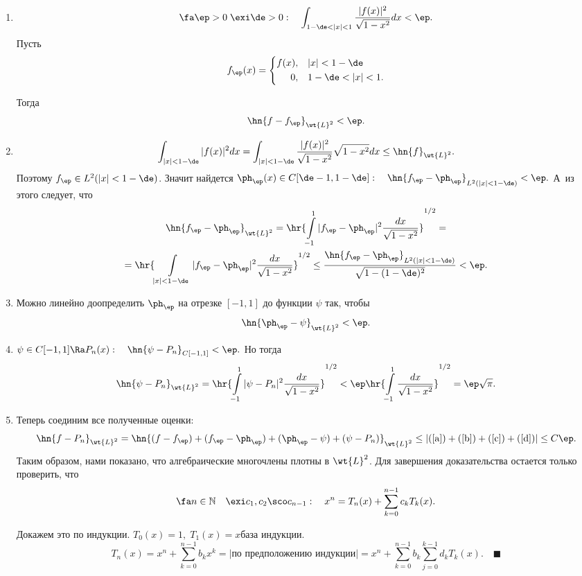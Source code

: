 \documentclass[a4paper]{article}
\begin{document}
\begin{enumerate}
\item
$$\fa\ep>0\;\exi\de>0:\quad\int_{1-\de<|x|<1}\frac{|f(x)|^2}{\sqrt{1-x^2}}dx<\ep.$$
Пусть
$$f_{\ep}(x)=\left\{\begin{aligned}f(x),&\quad|x|<1-\de\\
0,&\quad1-\de<|x|<1.\end{aligned}\right.$$

Тогда
\begin{equation}\label{a}
\hn{f-f_{\ep}}_{\wt{L}^2}<\ep.
\end{equation}
\item
$$\int_{|x|<1-\de}|f(x)|^2dx=\int_{|x|<1-\de}\frac{|f(x)|^2}{\sqrt{1-x^2}}\sqrt{1-x^2}dx\le\hn{f}_{\wt{L}^2}.$$
Поэтому $f_{\ep}\in L^2(|x|<1-\de)$. Значит найдется $\ph_{\ep}(x)\in
C[\de-1,1-\de]:\quad\hn{f_{\ep}-\ph_{\ep}}_{L^2(|x|<1-\de)}<\ep.$ А~из этого
следует, что
\begin{multline}\label{b}
\hn{f_{\ep}-\ph_{\ep}}_{\wt{L}^2}=\hr{\int\limits_{-1}^1|f_{\ep}-\ph_{\ep}|^2\frac{dx}{\sqrt{1-x^2}}}^{1/2}=\\
=\hr{\int\limits_{|x|<1-\de}|f_{\ep}-\ph_{\ep}|^2\frac{dx}{\sqrt{1-x^2}}}^{1/2}\le\frac{\hn{f_{\ep}-\ph_{\ep}}_{L^2(|x|<1-\de)}}{\sqrt{1-(1-\de)^2}}<\ep.
\end{multline}

\item
Можно линейно доопределить $\ph_{\ep}$ на отрезке
$[-1,1]$ до функции $\psi$ так, чтобы
\begin{equation}\label{c}
\hn{\ph_{\ep}-\psi}_{\wt{L}^2}<\ep.
\end{equation}
\item
$\psi\in C[-1,1]\Ra P_n(x):\quad
\hn{\psi-P_n}_{C[-1,1]}<\ep.$ Но тогда
\begin{equation}\label{d}
\hn{\psi-P_n}_{\wt{L}^2}=\hr{\int\limits_{-1}^1|\psi-P_n|^2\frac{dx}{\sqrt{1-x^2}}}^{1/2}<\ep\hr{\int\limits_{-1}^1\frac{dx}{\sqrt{1-x^2}}}^{1/2}=\ep\sqrt{\pi}.
\end{equation}
\item
Теперь соединим все полученные оценки:
$$\hn{f-P_n}_{\wt{L}^2}=\hn{(f-f_{\ep})+(f_{\ep}-\ph_{\ep})+(\ph_{\ep}-\psi)+(\psi-P_n)}_{\wt{L}^2}\le|(\ref{a})+(\ref{b})+(\ref{c})+(\ref{d})|\le C\ep.$$
Таким образом, нами показано, что алгебраические многочлены плотны
в $\wt{L}^2$. Для завершения доказательства остается только
проверить, что
$$\fa n\in\mathbb{N}\quad\exi
c_1,c_2\sco c_{n-1}:\quad
x^n=T_n(x)+\sum_{k=0}^{n-1}c_kT_k(x).$$

Докажем это по индукции. $T_0(x)=1,\;T_1(x)=x$\т база индукции.
$$T_n(x)=x^n+\sum_{k=0}^{n-1}b_kx^k=|\text{по предположению индукции}|=x^n+\sum_{k=0}^{n-1}b_k\sum_{j=0}^{k-1}d_kT_k(x).\quad\blacksquare$$



\end{enumerate}
\end{document}
